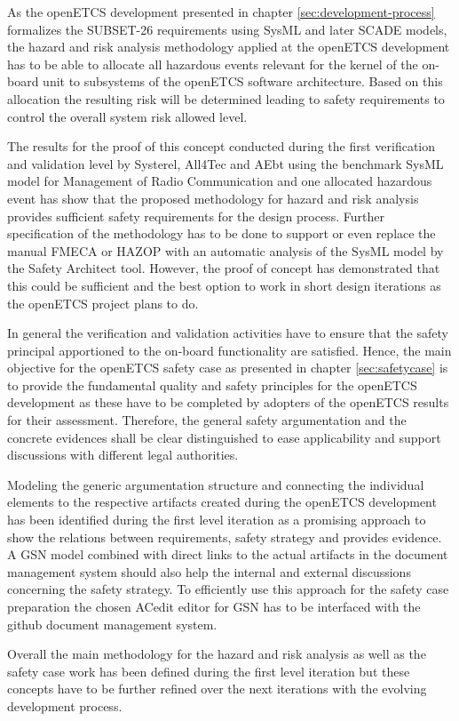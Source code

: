 \documentclass{template/openetcs_report}
\begin{document}
As the openETCS development presented in chapter \ref{sec:development-process} formalizes the SUBSET-26 requirements using SysML and later SCADE models, the hazard and risk analysis methodology applied at the openETCS development has to be able to allocate all hazardous events relevant for the kernel of the on-board unit to subsystems of the openETCS software architecture. Based on this allocation the resulting risk will be determined leading to safety requirements to control the overall system risk allowed level. 

The results for the proof of this concept conducted during the first verification and validation level by Systerel, All4Tec and AEbt using the benchmark SysML model for Management of Radio Communication and one allocated hazardous event has show that the proposed methodology for hazard and risk analysis provides sufficient safety requirements for the design process. Further specification of the methodology has to be done to support or even replace the manual FMECA or HAZOP with an automatic analysis of the SysML model by the Safety Architect tool. However, the proof of concept has demonstrated that this could be sufficient and the best option to work in short design iterations as the openETCS project plans to do. 

In general the verification and validation activities have to ensure that the safety principal apportioned to the on-board functionality are satisfied. Hence, the main objective for the openETCS safety case as presented in chapter \ref{sec:safetycase} is to provide the fundamental quality and safety principles for the openETCS development as these have to be completed by adopters of the openETCS results for their assessment. Therefore, the general safety argumentation and the concrete evidences shall be clear distinguished to ease applicability and support discussions with different legal authorities.

Modeling the generic argumentation structure and connecting the individual elements to the respective artifacts created during the openETCS development has been identified during the first level iteration as a promising approach to show the relations between requirements, safety strategy and provides evidence. A GSN model combined with direct links to the actual artifacts in the document management system should also help the internal and external discussions concerning the safety strategy. To efficiently use this approach for the safety case preparation the  chosen ACedit editor for GSN has to be interfaced with the github document management system. 

Overall the main methodology for the hazard and risk analysis as well as the safety case work has been defined during the first level iteration but these concepts have to be further refined over the next iterations with the evolving development process.





\end{document}
